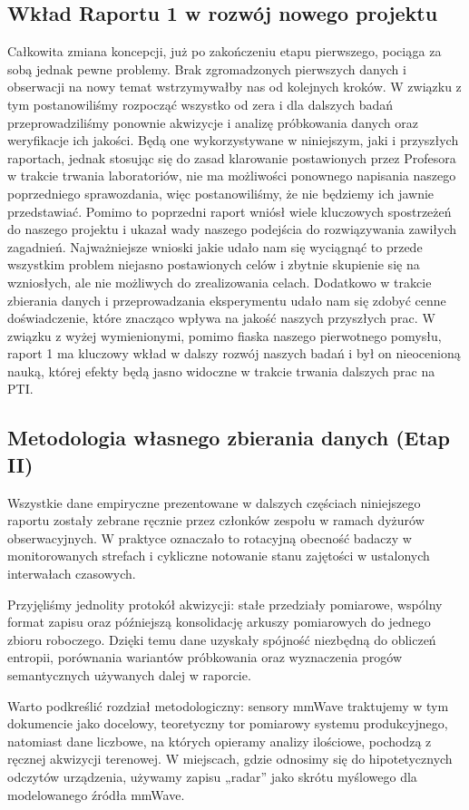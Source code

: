 \documentclass[14pt,a4paper]{extarticle}
\begin{document}
\subsection{Wkład Raportu 1 w rozwój nowego projektu}
Całkowita zmiana koncepcji, już po zakończeniu etapu pierwszego, pociąga za sobą jednak pewne problemy. Brak zgromadzonych pierwszych danych i obserwacji na nowy temat wstrzymywałby nas od kolejnych kroków. W związku z tym postanowiliśmy rozpocząć wszystko od zera i dla dalszych badań przeprowadziliśmy ponownie akwizycje i analizę próbkowania danych oraz weryfikacje ich jakości. Będą one wykorzystywane w niniejszym, jaki i przyszłych raportach, jednak stosując się do zasad klarowanie postawionych przez Profesora w trakcie trwania laboratoriów, nie ma możliwości ponownego napisania naszego poprzedniego sprawozdania, więc postanowiliśmy, że nie będziemy ich jawnie przedstawiać. Pomimo to poprzedni raport wniósł wiele kluczowych spostrzeżeń do naszego projektu i ukazał wady naszego podejścia do rozwiązywania zawiłych zagadnień. Najważniejsze wnioski jakie udało nam się wyciągnąć to przede wszystkim problem niejasno postawionych celów i zbytnie skupienie się na wzniosłych, ale nie możliwych do zrealizowania celach. Dodatkowo w trakcie zbierania danych i przeprowadzania eksperymentu udało nam się zdobyć cenne doświadczenie, które znacząco wpływa na jakość naszych przyszłych prac. W związku z wyżej wymienionymi, pomimo fiaska naszego pierwotnego pomysłu, raport 1 ma kluczowy wkład w dalszy rozwój naszych badań i był on nieocenioną nauką, której efekty będą jasno widoczne w trakcie trwania dalszych prac na PTI.
\subsection{Metodologia własnego zbierania danych (Etap II)}
Wszystkie dane empiryczne prezentowane w dalszych częściach niniejszego raportu zostały zebrane ręcznie przez członków zespołu w ramach dyżurów obserwacyjnych. W praktyce oznaczało to rotacyjną obecność badaczy w monitorowanych strefach i cykliczne notowanie stanu zajętości w ustalonych interwałach czasowych.

Przyjęliśmy jednolity protokół akwizycji: stałe przedziały pomiarowe, wspólny format zapisu oraz późniejszą konsolidację arkuszy pomiarowych do jednego zbioru roboczego. Dzięki temu dane uzyskały spójność niezbędną do obliczeń entropii, porównania wariantów próbkowania oraz wyznaczenia progów semantycznych używanych dalej w raporcie.

Warto podkreślić rozdział metodologiczny: sensory mmWave traktujemy w tym dokumencie jako docelowy, teoretyczny tor pomiarowy systemu produkcyjnego, natomiast dane liczbowe, na których opieramy analizy ilościowe, pochodzą z ręcznej akwizycji terenowej. W miejscach, gdzie odnosimy się do hipotetycznych odczytów urządzenia, używamy zapisu „radar” jako skrótu myślowego dla modelowanego źródła mmWave.
\end{document}

